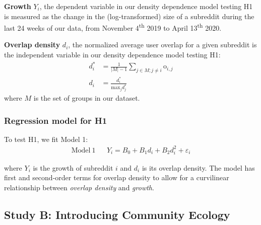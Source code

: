 \documentclass[letterpaper]{article}\usepackage[]{graphicx}\usepackage[]{color}
\begin{document}
\vspace{0.8em}
\noindent \textbf{Growth} $Y_i$, the dependent variable in our density dependence model testing H1 is measured as the change in the (log-transformed) size of a subreddit during the last 24 weeks of our data, from November 4\textsuperscript{th} 2019 to April 13\textsuperscript{th} 2020. 
\vspace{0.8em}

\noindent \textbf{Overlap density} $d_i$, the normalized average user overlap for a given subreddit is the independent variable in our density dependence model testing H1:
\begin{align}\label{eq:user.overlap.density}
  d^*_{i} &= \frac{1}{\left|M\right|-1} \sum_{j\in M;j\ne i} \mathrm{o}_{i,j} \nonumber \\
  d_{i} &= \frac{d_i^*}{\mathrm{max}_j d_j^*}
\end{align}
\noindent where $M$ is the set of groups in our dataset.


\subsubsection{Regression model for H1} \label{sec:reg.H1}
To test H1, we fit Model 1:
\begin{align}
\mathrm{Model~1} & & Y_i = B_0 + B_1 d_{i} + B_2 d^2_{i} + \varepsilon_i \label{eq:M1}
\end{align}

\noindent where $Y_i$ is the growth of subreddit $i$ and $d_i$ is its overlap density. The model has first and second-order terms for overlap density to allow for a curvilinear relationship between \emph{overlap density} and \emph{growth}.

\subsection{Study B: Introducing Community Ecology}
\end{document}
